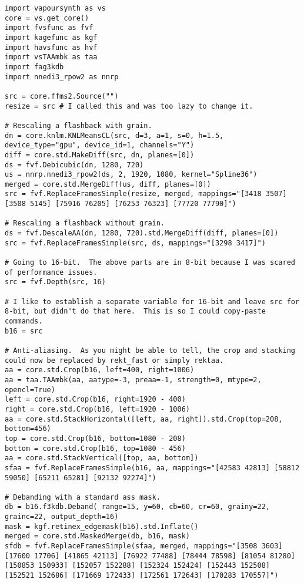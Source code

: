 \documentclass{scrartcl}
\begin{document}
\begin{lstlisting}
import vapoursynth as vs
core = vs.get_core()
import fvsfunc as fvf
import kagefunc as kgf
import havsfunc as hvf
import vsTAAmbk as taa
import fag3kdb
import nnedi3_rpow2 as nnrp

src = core.ffms2.Source("")
resize = src # I called this and was too lazy to change it.

# Rescaling a flashback with grain.
dn = core.knlm.KNLMeansCL(src, d=3, a=1, s=0, h=1.5, device_type="gpu", device_id=1, channels="Y")
diff = core.std.MakeDiff(src, dn, planes=[0])
ds = fvf.Debicubic(dn, 1280, 720)
us = nnrp.nnedi3_rpow2(ds, 2, 1920, 1080, kernel="Spline36")
merged = core.std.MergeDiff(us, diff, planes=[0])
src = fvf.ReplaceFramesSimple(resize, merged, mappings="[3418 3507] [3508 5145] [75916 76205] [76253 76323] [77720 77790]")

# Rescaling a flashback without grain.
ds = fvf.DescaleAA(dn, 1280, 720).std.MergeDiff(diff, planes=[0])
src = fvf.ReplaceFramesSimple(src, ds, mappings="[3298 3417]")

# Going to 16-bit.  The above parts are in 8-bit because I was scared of performance issues.
src = fvf.Depth(src, 16)

# I like to establish a separate variable for 16-bit and leave src for 8-bit, but didn't do that here.  This is so I could copy-paste commands.
b16 = src

# Anti-aliasing.  As you might be able to tell, the crop and stacking could now be replaced by rekt_fast or simply rektaa.
aa = core.std.Crop(b16, left=400, right=1006)
aa = taa.TAAmbk(aa, aatype=-3, preaa=-1, strength=0, mtype=2, opencl=True)
left = core.std.Crop(b16, right=1920 - 400)
right = core.std.Crop(b16, left=1920 - 1006)
aa = core.std.StackHorizontal([left, aa, right]).std.Crop(top=208, bottom=456)
top = core.std.Crop(b16, bottom=1080 - 208)
bottom = core.std.Crop(b16, top=1080 - 456)
aa = core.std.StackVertical([top, aa, bottom])
sfaa = fvf.ReplaceFramesSimple(b16, aa, mappings="[42583 42813] [58812 59050] [65211 65281] [92132 92274]")

# Debanding with a standard ass mask.
db = b16.f3kdb.Deband( range=15, y=60, cb=60, cr=60, grainy=22, grainc=22, output_depth=16)
mask = kgf.retinex_edgemask(b16).std.Inflate() 
merged = core.std.MaskedMerge(db, b16, mask)
sfdb = fvf.ReplaceFramesSimple(sfaa, merged, mappings="[3508 3603] [17600 17706] [41865 42113] [76922 77488] [78444 78598] [81054 81280] [150853 150933] [152057 152288] [152324 152424] [152443 152508] [152521 152686] [171669 172433] [172561 172643] [170283 170557]")


\end{lstlisting}
\end{document}
